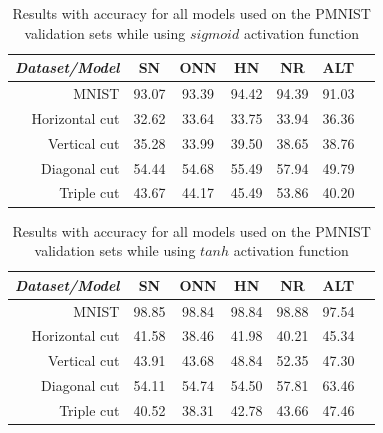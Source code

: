\documentclass[b5paper]{book}
\begin{document}
\begin{table}[ht]
  \centering
  \begin{tabular}{rS[table-format=2.1]S[table-format=2.1]S[table-format=2.1]S[table-format=2.1]S[table-format=2.1]S[table-format=2.1]}
    \toprule
     \textit{Dataset/Model} & SN & ONN & HN & NR & ALT \\
    \midrule
    {MNIST} & {93.07} & {93.39} & {94.42} & {94.39} & {91.03} \\
    {Horizontal cut} & {32.62} & {33.64} & {33.75} & {33.94} & {36.36} \\
    {Vertical cut} & {35.28} & {33.99} & {39.50} & {38.65} & {38.76} \\
    {Diagonal cut} & {54.44} & {54.68} & {55.49} & {57.94} & {49.79} \\
    {Triple cut} & {43.67} & {44.17} & {45.49} & {53.86} & {40.20} \\
    
    \bottomrule
  \end{tabular}
  \caption{Results with accuracy for all models used on the PMNIST validation sets while using \( sigmoid \) activation function}
  \label{tab:results-sigmoid}
\end{table} 

\begin{table}[ht]
  \centering
  \begin{tabular}{rS[table-format=2.1]S[table-format=2.1]S[table-format=2.1]S[table-format=2.1]S[table-format=2.1]S[table-format=2.1]}
    \toprule
     \textit{Dataset/Model} & SN & ONN & HN & NR & ALT \\
    \midrule
    {MNIST} & {98.85} & {98.84} & {98.84} & {98.88} & {97.54} \\
    {Horizontal cut} & {41.58} & {38.46} & {41.98} & {40.21} & {45.34} \\
    {Vertical cut} & {43.91} & {43.68} & {48.84} & {52.35} & {47.30} \\
    {Diagonal cut} & {54.11} & {54.74} & {54.50} & {57.81} & {63.46} \\
    {Triple cut} & {40.52} & {38.31} & {42.78} & {43.66} & {47.46} \\
    
    \bottomrule
  \end{tabular}
  \caption{Results with accuracy for all models used on the PMNIST validation sets while using \( tanh \) activation function}
  \label{tab:results-tanh}
\end{table} 
\end{document}
